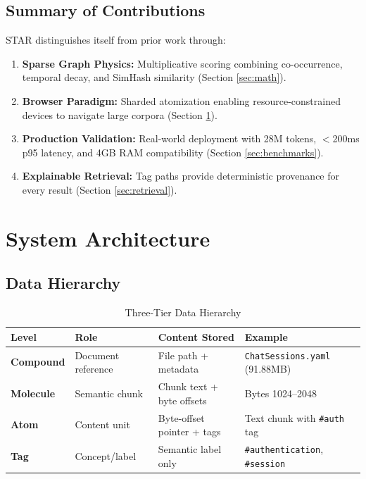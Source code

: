 \documentclass[11pt]{article}
\begin{document}
\subsection{Summary of Contributions}

STAR distinguishes itself from prior work through:
\begin{enumerate}
    \item \textbf{Sparse Graph Physics:} Multiplicative scoring combining co-occurrence, temporal decay, and SimHash similarity (Section \ref{sec:math}).
    \item \textbf{Browser Paradigm:} Sharded atomization enabling resource-constrained devices to navigate large corpora (Section \ref{sec:architecture}).
    \item \textbf{Production Validation:} Real-world deployment with 28M tokens, $<$200ms p95 latency, and 4GB RAM compatibility (Section \ref{sec:benchmarks}).
    \item \textbf{Explainable Retrieval:} Tag paths provide deterministic provenance for every result (Section \ref{sec:retrieval}).
\end{enumerate}

\section{System Architecture}
\label{sec:architecture}

\subsection{Data Hierarchy}

\begin{table}[h]
\centering
\caption{Three-Tier Data Hierarchy}
\label{tab:hierarchy}
\begin{tabular}{@{}llll@{}}
\toprule
\textbf{Level} & \textbf{Role} & \textbf{Content Stored} & \textbf{Example} \\ \midrule
\textbf{Compound} & Document reference & File path + metadata & \texttt{ChatSessions.yaml} (91.88MB) \\
\textbf{Molecule} & Semantic chunk & Chunk text + byte offsets & Bytes 1024--2048 \\
\textbf{Atom} & Content unit & Byte-offset pointer + tags & Text chunk with \texttt{\#auth} tag \\
\textbf{Tag} & Concept/label & Semantic label only & \texttt{\#authentication}, \texttt{\#session} \\ \bottomrule
\end{tabular}
\end{table}
\end{document}
